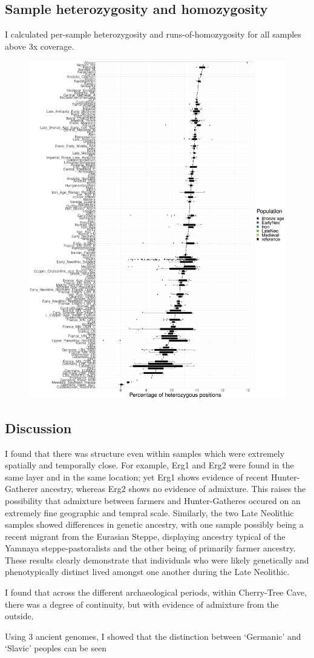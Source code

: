 \subsection{Sample heterozygosity and homozygosity}

I calculated per-sample heterozygosity and runs-of-homozygosity  for all samples above 3x coverage. 

\begin{figure}[htp]
    \centering
    \includegraphics[width=1.0\textwidth]{../images/chapter4/het_per_pop.pdf}
    \caption{}
    \label{fig:het_per_pop}
\end{figure}

\subsection{Discussion}

I found that there was structure even within samples which were extremely spatially and temporally close. For example, Erg1 and Erg2 were found in the same layer and in the same location; yet Erg1 shows evidence of recent Hunter-Gatherer ancestry, whereas Erg2 shows no evidence of admixture. This raises the possibility that admixture between farmers and Hunter-Gatheres occured on an extremely fine geographic and tempral scale. Similarly, the two Late Neolithic samples showed differences in genetic ancestry, with one sample possibly being a recent migrant from the Eurasian Steppe, displaying ancestry typical of the Yamnaya steppe-pastoralists and the other being of primarily farmer ancestry. These results clearly demonstrate that individuals who were likely genetically and phenotypically distinct lived amongst one another during the Late Neolithic. 

I found that across the different archaeological periods, within Cherry-Tree Cave, there was a degree of continuity, but with evidence of admixture from the outside. 

Using 3 ancient genomes, I showed that the distinction between `Germanic' and `Slavic' peoples can be seen 